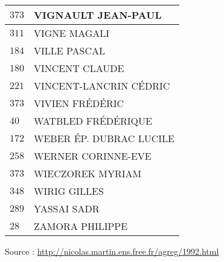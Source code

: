 \begin{xltabular}{\linewidth}{|l|X|}
    \hline
    $373$ & VIGNAULT JEAN-PAUL \\
    \hline
    $311$ & VIGNE MAGALI \\
    \hline
    $184$ & VILLE PASCAL \\
    \hline
    $180$ & VINCENT CLAUDE \\
    \hline
    $221$ & VINCENT-LANCRIN CÉDRIC \\
    \hline
    $373$ & VIVIEN FRÉDÉRIC \\
    \hline
    $40$ & WATBLED FRÉDÉRIQUE \\
    \hline
    $172$ & WEBER ÉP. DUBRAC LUCILE \\
    \hline
    $258$ & WERNER CORINNE-EVE \\
    \hline
    $373$ & WIECZOREK MYRIAM \\
    \hline
    $348$ & WIRIG GILLES \\
    \hline
    $289$ & YASSAI SADR \\
    \hline
    $28$ & ZAMORA PHILIPPE \\
    \hline
  \end{xltabular}

  \begin{flushright}
    {\tiny Source : \url{http://nicolas.martin.ens.free.fr/agreg/1992.html}}
  \end{flushright}


